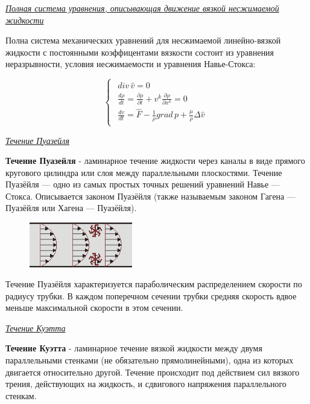 \begin{center}
	\textit{\underline{Полная система уравнения, описывающая движение вязкой несжимаемой жидкости}}
\end{center}


Полна система механических уравнений для несжимаемой линейно-вязкой жидкости с постоянными коэффицентами вязкости состоит из уравнения неразрывности, условия несжимаемости и уравнения Навье-Стокса:

\begin{equation} \label{eq:task}
	\begin{cases}
		\begin{array}{l}
			div \, \hat{v} = 0\\
			\frac{d\rho}{dt} = \frac{\partial \rho}{\partial t} + v^k\frac{\partial \rho}{\partial x^k} = 0\\
			\frac{dv}{dt} = \hat{F} - \frac{1}{\rho}grad\, p + \frac{\mu}{\rho}\Delta \hat{v}
		\end{array}
	\end{cases}
\end{equation}

\begin{center}
	\textit{\underline{Течение Пуазейля}}
\end{center}

\begin{defn}
	\textbf{Течение Пуазейля} - ламинарное течение жидкости через каналы в виде прямого кругового цилиндра или слоя между параллельными плоскостями. Течение Пуазёйля — одно из самых простых точных решений уравнений Навье — Стокса. Описывается законом Пуазёйля (также называемым законом Гагена — Пуазёйля или Хагена — Пуазёйля).
\end{defn}

\begin{figure}[H]
	\centering
	\includegraphics[width=0.4\textwidth]{16/poiseuille_profile.png}
\end{figure}

Течение Пуазёйля характеризуется параболическим распределением скорости по радиусу трубки. В каждом поперечном сечении трубки средняя скорость вдвое меньше максимальной скорости в этом сечении.


\begin{center}
	\textit{\underline{Течение Куэтта}}
\end{center}

\begin{defn}
	\textbf{Течение Куэтта} - ламинарное течение вязкой жидкости между двумя параллельными стенками (не обязательно прямолинейными), одна из которых двигается относительно другой. Течение происходит под действием сил вязкого трения, действующих на жидкость, и сдвигового напряжения параллельного стенкам.
\end{defn}


